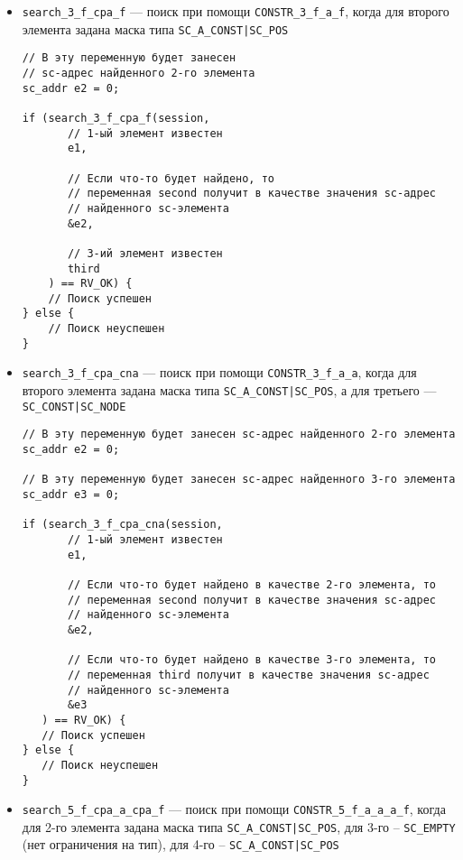 \begin{itemize}
\item \lstinline|search_3_f_cpa_f| --- поиск при помощи
  \lstinline|CONSTR_3_f_a_f|, когда для второго элемента задана маска
  типа \lstinline+SC_A_CONST|SC_POS+

\begin{lstlisting}[texcl]
// В эту переменную будет занесен
// sc-адрес найденного 2-го элемента
sc_addr e2 = 0;

if (search_3_f_cpa_f(session,
       // 1-ый элемент известен
       e1,

       // Если что-то будет найдено, то
       // переменная second получит в качестве значения sc-адрес
       // найденного sc-элемента
       &e2,

       // 3-ий элемент известен
       third
    ) == RV_OK) {
    // Поиск успешен
} else {
    // Поиск неуспешен
}
\end{lstlisting}

\item \lstinline|search_3_f_cpa_cna| --- поиск при помощи
  \lstinline|CONSTR_3_f_a_a|, когда для второго элемента задана маска
  типа \lstinline+SC_A_CONST|SC_POS+, а для третьего ---
  \lstinline+SC_CONST|SC_NODE+

\begin{lstlisting}[texcl]
// В эту переменную будет занесен sc-адрес найденного 2-го элемента
sc_addr e2 = 0;

// В эту переменную будет занесен sc-адрес найденного 3-го элемента
sc_addr e3 = 0;

if (search_3_f_cpa_cna(session,
       // 1-ый элемент известен
       e1,

       // Если что-то будет найдено в качестве 2-го элемента, то
       // переменная second получит в качестве значения sc-адрес
       // найденного sc-элемента
       &e2,

       // Если что-то будет найдено в качестве 3-го элемента, то
       // переменная third получит в качестве значения sc-адрес
       // найденного sc-элемента
       &e3
   ) == RV_OK) {
   // Поиск успешен
} else {
   // Поиск неуспешен
}
\end{lstlisting}

\item \lstinline|search_5_f_cpa_a_cpa_f| --- поиск при помощи
  \lstinline|CONSTR_5_f_a_a_a_f|, когда для 2-го элемента задана маска
  типа \lstinline+SC_A_CONST|SC_POS+, для 3-го -- \lstinline+SC_EMPTY+
  (нет ограничения на тип), для 4-го -- \lstinline+SC_A_CONST|SC_POS+


\end{itemize}
